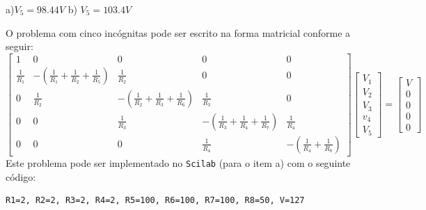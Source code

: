\begin{resp}
a)$V_5=98.44V$ b) $V_5=103.4V$

O problema com cinco incógnitas pode ser escrito na forma matricial conforme a seguir:
\begin{equation}\left[\begin{array}{ccccc}
1&0&0&0&0\\[.5cm]
\frac{1}{R_1}&-\left(\frac{1}{R_1}+\frac{1}{R_2}+\frac{1}{R_5}\right)&\frac{1}{R_2}&0&0\\[.5cm]
0&\frac{1}{R_2}&-\left(\frac{1}{R_2}+\frac{1}{R_3}+\frac{1}{R_6}\right)&\frac{1}{R_3}&0\\[.5cm]
0&0&\frac{1}{R_3}&-\left(\frac{1}{R_3}+\frac{1}{R_4}+\frac{1}{R_7}\right)&\frac{1}{R_4}\\[.5cm]
0&0&0&\frac{1}{R_4}&-\left(\frac{1}{R_4}+\frac{1}{R_8}\right)
\end{array}
\right]
\left[\begin{array}{c}
V_1\\[.65cm]
V_2\\[.65cm]
V_3\\[.65cm]
v_4\\[.65cm]
V_5
\end{array}
\right]=
\left[\begin{array}{c}
V\\[.65cm]
0\\[.65cm]
0\\[.65cm]
0\\[.65cm]
0
\end{array}
\right] \end{equation}
Este problema pode ser implementado no \verb+Scilab+ (para o item a) com o seguinte código:
\begin{verbatim}
R1=2, R2=2, R3=2, R4=2, R5=100, R6=100, R7=100, R8=50, V=127


\end{verbatim}
\end{resp}
